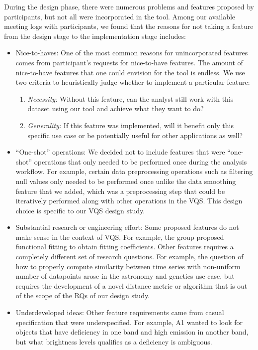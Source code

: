{
\par During the design phase, there were numerous problems and features proposed by participants, but not all were incorporated in the tool. Among our available meeting logs with participants, we found that the reasons for not taking a feature from the design stage to the implementation stage includes: 
\begin{itemize}
\item Nice-to-haves: One of the most common reasons for unincorporated features comes from participant's requests for nice-to-have features. The amount of nice-to-have features that one could envision for the tool is endless. We use 
two criteria to heuristically judge whether to implement a particular feature:
\begin{enumerate}
\item \textit{Necessity:} Without this feature, can the analyst still work with this dataset using our tool and achieve what they want to do? 
\item \textit{Generality:} If this feature was implemented, will it benefit only this specific use case or be potentially useful for other applications as well?
\end{enumerate}
\item ``One-shot'' operations: We decided not to include features that were ``one-shot'' operations that only needed to be performed once during the analysis workflow. For example, certain data preprocessing operations such as filtering null values only needed to be performed once unlike the data smoothing feature that we added, which was a preprocessing step that could be iteratively performed along with other operations in the VQS. This design choice is specific to our VQS design study.
\item Substantial research or engineering effort: Some proposed features do not make sense in the context of VQS. For example, the \matsci group proposed functional fitting to obtain fitting coefficients. Other features requires a completely different set of research questions. For example, the question of how to properly compute similarity between time series with non-uniform number of datapoints arose in the astronomy and genetics use case, but requires the development of a novel distance metric or algorithm that is out of the scope of the RQs of our design study.
\item Underdeveloped ideas: Other feature requirements came from casual specification that were underspecified. For example, A1 wanted to look for objects that have deficiency in one band and high emission in another band, but what brightness levels qualifies as a deficiency is ambiguous.

\end{itemize}}
